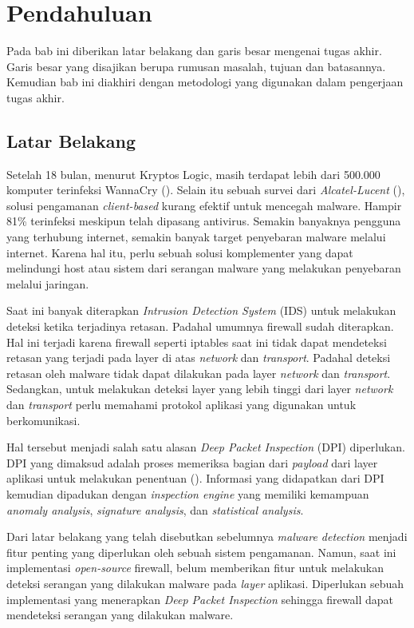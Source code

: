 \chapter{Pendahuluan}

Pada bab ini diberikan latar belakang dan garis besar mengenai tugas akhir. Garis besar yang disajikan berupa rumusan masalah, tujuan dan batasannya. Kemudian bab ini diakhiri dengan metodologi yang digunakan dalam pengerjaan tugas akhir.

\section{Latar Belakang}

Setelah 18 bulan, menurut Kryptos Logic, masih terdapat lebih dari 500.000 komputer terinfeksi WannaCry (\cite{WannaCry95:online}). Selain itu sebuah survei dari \textit{Alcatel-Lucent} (\cite{alcatel_lucent_2013}), solusi pengamanan \textit{client-based} kurang efektif untuk mencegah malware. Hampir 81\% terinfeksi meskipun telah dipasang antivirus. Semakin banyaknya pengguna yang terhubung internet, semakin banyak target penyebaran malware melalui internet. Karena hal itu, perlu sebuah solusi komplementer yang dapat melindungi host atau sistem dari serangan malware yang melakukan penyebaran melalui jaringan.

Saat ini banyak diterapkan \textit{Intrusion Detection System} (IDS) untuk melakukan deteksi ketika terjadinya retasan. Padahal umumnya firewall sudah diterapkan. Hal ini terjadi karena firewall seperti iptables saat ini tidak dapat mendeteksi retasan yang terjadi pada layer di atas \textit{network} dan \textit{transport}. Padahal deteksi retasan oleh malware tidak dapat dilakukan pada layer \textit{network} dan \textit{transport}. Sedangkan, untuk melakukan deteksi layer yang lebih tinggi dari layer \textit{network} dan \textit{transport} perlu memahami protokol aplikasi yang digunakan untuk berkomunikasi. 

Hal tersebut menjadi salah satu alasan \textit{Deep Packet Inspection} (DPI) diperlukan. DPI yang dimaksud adalah proses memeriksa bagian dari \textit{payload} dari layer aplikasi untuk melakukan penentuan (\cite{dubrawsky2003firewall}). Informasi yang didapatkan dari DPI kemudian dipadukan dengan \textit{inspection engine} yang memiliki kemampuan \textit{anomaly analysis}, \textit{signature analysis}, dan \textit{statistical analysis}. 

Dari latar belakang yang telah disebutkan sebelumnya \textit{malware detection} menjadi fitur penting yang diperlukan oleh sebuah sistem pengamanan. Namun, saat ini implementasi \textit{open-source} firewall, belum memberikan fitur untuk melakukan deteksi serangan yang dilakukan malware pada \textit{layer} aplikasi. Diperlukan sebuah implementasi yang menerapkan \textit{Deep Packet Inspection} sehingga firewall dapat mendeteksi serangan yang dilakukan malware.


